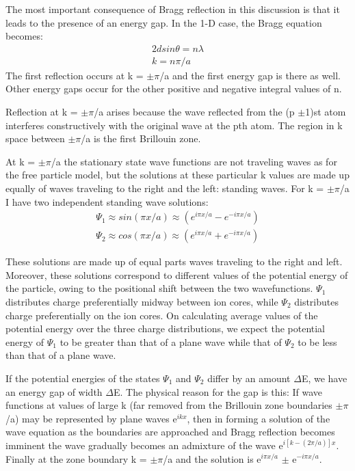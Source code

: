 The most important consequence of Bragg reflection in this discussion is that it leads to the presence of an energy gap. In the 1-D case, the Bragg equation becomes:
\begin{equation}
\begin{split}
2dsin\theta = n\lambda \\
k = n\pi/a
\end{split}
\end{equation}
The first reflection occurs at k = $\pm\pi$/a and the first energy gap is there as well. Other energy gaps occur for the other positive and negative integral values of n.

Reflection at k = $\pm\pi$/a arises because the wave reflected from the (p $\pm$1)st atom interferes constructively with the original wave at the pth atom. The region in k space between $\pm\pi$/a is the first Brillouin zone.

At k = $\pm\pi$/a the stationary state wave functions are not traveling waves as for the free particle model, but the solutions at these particular k values are made up equally of waves traveling to the right and the left: standing waves.  For k = $\pm\pi$/a I have two independent standing wave solutions:
\begin{equation}
\begin{split}
\Psi_1 \approx sin(\pi x/a) \approx (e^{i\pi x/a}- e^{-i\pi x /a}) \\
\Psi_2 \approx cos(\pi x/a) \approx (e^{i\pi x/a}+ e^{-i\pi x /a})
\end{split}
\end{equation}

These solutions are made up of equal parts waves traveling to the right and left. Moreover, these solutions correspond to different values of the potential energy of the particle, owing to the positional shift between the two wavefunctions. $\Psi_1$ distributes charge preferentially midway between ion cores, while $\Psi_2$ distributes charge preferentially on the ion cores. On calculating average values of the potential energy over the three charge distributions, we expect the potential energy of $\Psi_1$ to be greater than that of a plane wave while that of $\Psi_2$ to be less than that of a plane wave.

If the potential energies of the states  $\Psi_1$ and $\Psi_2$ differ by an amount $\Delta$E, we have an energy gap  of width $\Delta$E. The physical reason for the gap is this: If wave functions at values of large k (far removed from the Brillouin zone boundaries $\pm\pi$/a) may be represented by plane waves e$^{ikx}$, then in forming a solution of the wave equation as the boundaries are approached and Bragg reflection becomes imminent the wave gradually becomes an admixture of the wave e$^{i[k-(2\pi/a)]x}$. Finally at the zone boundary k = $\pm\pi$/a and the solution is e$^{i\pi x/a}$ $\pm$ e$^{-i\pi x /a}$. 

